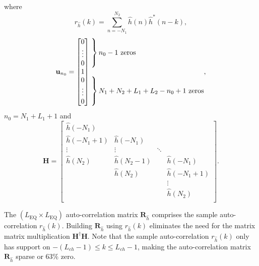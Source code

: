 where
\begin{equation}
r_{\hat{h}}(k) = \sum_{n=-N_1}^{N_2} \hat{h}(n) \hat{h}^\ast(n-k),
\label{eq:sample_autocorrelation}
\end{equation}
\begin{equation}
\mathbf{u}_{n_0} = \begin{bmatrix} 0 \\ \vdots \\ 0 \\ 1 \\ 0 \\ \vdots \\ 0 \end{bmatrix}
	\begin{matrix*}[l] \left. \vphantom{\begin{matrix} 0 \\ \vdots \\ 0 \end{matrix}} \right\}
		\text{$n_0-1$ zeros}
		\\ \\
		\left. \vphantom{\begin{matrix} 0 \\ \vdots \\ 0 \end{matrix}} \right\}
		\text{$N_1+N_2+L_1+L_2-n_0+1$ zeros}
		\end{matrix*},
		\label{eq:un0_ZF}
\end{equation}
$n_0 = N_1+L_1+1$ and
\begin{equation} 
\mathbf{H} = 
		\begin{bmatrix}
		\hat{h}(-N_1)		&  				& 		 	&  					\\
		\hat{h}(-N_1+1) 	& \hat{h}(-N_1)	& 		 	&  					\\
		\vdots	 			& \vdots		& \ddots 	&  					\\
		\hat{h}(N_2)		& \hat{h}(N_2-1)&  			& \hat{h}(-N_1)  	\\
		 					& \hat{h}(N_2) 	&  			& \hat{h}(-N_1+1) 	\\
		 					&  	   			&  			& \vdots			\\
		 					&  	   			&  			& \hat{h}(N_2)		\\
	\end{bmatrix}.
\end{equation}

The $(L_\text{EQ} \times L_\text{EQ})$ auto-correlation matrix $\mathbf{R}_{\hat{h}}$ comprises the sample auto-correlation $r_{\hat{h}}(k)$.
Building $\mathbf{R}_{\hat{h}}$ using $r_{\hat{h}}(k)$ eliminates the need for the matrix matrix multiplication $\mathbf{H}^\dagger \mathbf{H}$.
Note that the sample auto-correlation $r_{\hat{h}}(k)$ only has support on $-(L_{ch}-1) \leq k \leq L_{ch}-1$, making the auto-correlation matrix $\mathbf{R}_{\hat{h}}$ sparse or $63\%$ zero.

